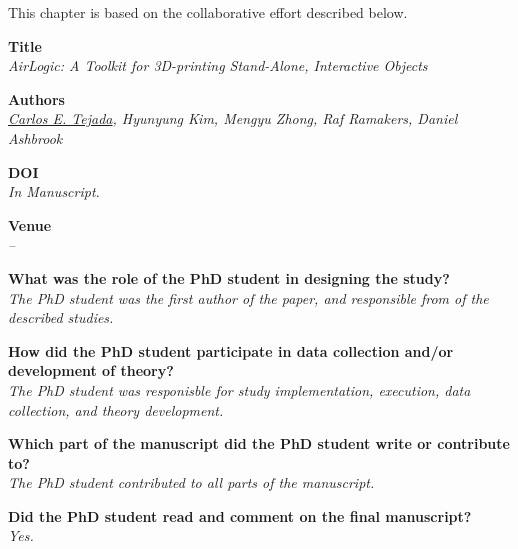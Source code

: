   This chapter is based on the collaborative effort described below.

  \vfill

  \noindent
  \textbf{Title}\\
  \textit{AirLogic: A Toolkit for 3D-printing Stand-Alone, Interactive Objects}

  \bigskip

  \noindent
  \textbf{Authors}\\
  \textit{\underline{Carlos E. Tejada}, Hyunyung Kim, Mengyu Zhong, Raf Ramakers, Daniel Ashbrook}

  \bigskip

  \noindent
  \textbf{DOI}\\
  \textit{In Manuscript.}

  \bigskip

  \noindent
  \textbf{Venue}\\
  \textit{--}

  \bigskip

  \noindent
  \textbf{What was the role of the PhD student in designing the study?}\\
  \textit{The PhD student was the first author of the paper, and responsible
    from of the described studies.}

  \bigskip

  \noindent
  \textbf{How did the PhD student participate in data collection and/or development of theory?}\\
  \textit{The PhD student was responisble for study implementation, execution,
    data collection, and theory development.}

  \bigskip

  \noindent
  \textbf{Which part of the manuscript did the PhD student write or contribute to?}\\
  \textit{The PhD student contributed to all parts of the manuscript.}

  \bigskip

  \noindent
  \textbf{Did the PhD student read and comment on the final manuscript?}\\
  \textit{Yes.}

  \bigskip
  \vfill

  \newpage

